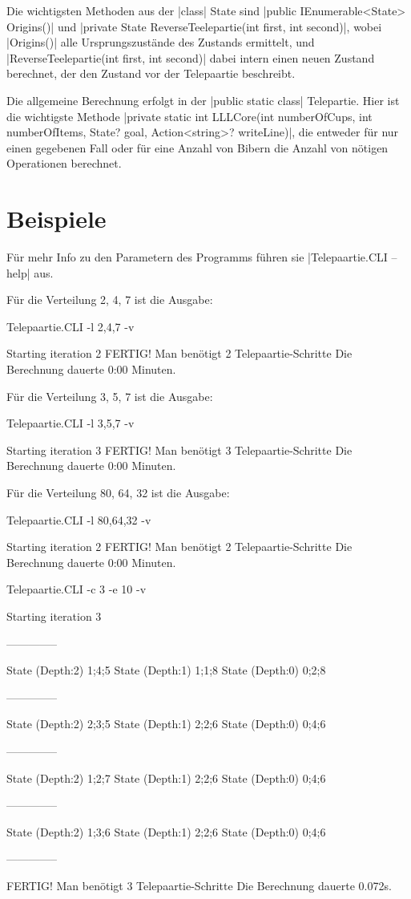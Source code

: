 \documentclass[a4paper,10pt,ngerman]{scrartcl}
\begin{document}
Die wichtigsten Methoden aus der |class| State sind |public IEnumerable<State> Origins()| und |private State ReverseTeelepartie(int first, int second)|, wobei |Origins()| alle Ursprungszustände des Zustands ermittelt, und |ReverseTeelepartie(int first, int second)| dabei intern einen neuen Zustand berechnet, der den Zustand vor der Telepaartie beschreibt. 

Die allgemeine Berechnung erfolgt in der |public static class| Telepartie. Hier ist die wichtigste Methode |private static int LLLCore(int numberOfCups, int numberOfItems, State? goal, Action<string>? writeLine)|, die entweder für nur einen gegebenen Fall oder für eine Anzahl von Bibern die Anzahl von nötigen Operationen berechnet.

\section{Beispiele}

Für mehr Info zu den Parametern des Programms führen sie |Telepaartie.CLI --help| aus.

Für die Verteilung 2, 4, 7 ist die Ausgabe:
\begin{lstcs}
Telepaartie.CLI -l 2,4,7 -v

Starting iteration 2
FERTIG!
Man benötigt 2 Telepaartie-Schritte
Die Berechnung dauerte 0:00 Minuten.
\end{lstcs}

Für die Verteilung 3, 5, 7 ist die Ausgabe:
\begin{lstcs}
Telepaartie.CLI -l 3,5,7 -v

Starting iteration 3
FERTIG!
Man benötigt 3 Telepaartie-Schritte
Die Berechnung dauerte 0:00 Minuten.
\end{lstcs}

Für die Verteilung 80, 64, 32 ist die Ausgabe:
\begin{lstcs}
Telepaartie.CLI -l 80,64,32 -v

Starting iteration 2
FERTIG!
Man benötigt 2 Telepaartie-Schritte
Die Berechnung dauerte 0:00 Minuten.
\end{lstcs}

\begin{lstcs}
Telepaartie.CLI -c 3 -e 10 -v

Starting iteration 3

--------------

State (Depth:2) {1;4;5}
State (Depth:1) {1;1;8}
State (Depth:0) {0;2;8}

--------------

State (Depth:2) {2;3;5}
State (Depth:1) {2;2;6}
State (Depth:0) {0;4;6}

--------------

State (Depth:2) {1;2;7}
State (Depth:1) {2;2;6}
State (Depth:0) {0;4;6}

--------------

State (Depth:2) {1;3;6}
State (Depth:1) {2;2;6}
State (Depth:0) {0;4;6}

--------------


FERTIG!
Man benötigt 3 Telepaartie-Schritte
Die Berechnung dauerte 0.072s.
\end{lstcs}
\end{document}
